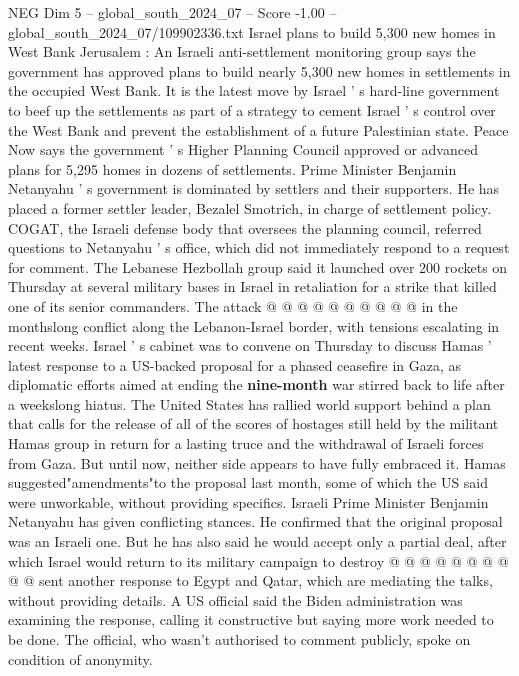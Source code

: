 \begin{textsample}{NEG Dim 5 – global\_south\_2024\_07 – Score -1.00 – global\_south\_2024\_07/109902336.txt}  \label{ex:f5_neg_272}
Israel plans to build 5,300 new homes in West Bank Jerusalem : An Israeli anti-settlement monitoring group says the government has approved plans to build nearly 5,300 new homes in settlements in the occupied West Bank.
It is the latest move by Israel ' s hard-line government to beef up the settlements as part of a strategy to cement Israel ' s control over the West Bank and prevent the establishment of a future Palestinian state.
Peace Now says the government ' s Higher Planning Council approved or advanced plans for 5,295 homes in dozens of settlements.
Prime Minister Benjamin Netanyahu ' s government is dominated by settlers and their supporters.
He has placed a former settler leader, Bezalel Smotrich, in charge of settlement policy.
COGAT, the Israeli defense body that oversees the planning council, referred questions to Netanyahu ' s office, which did not immediately respond to a request for comment.
The Lebanese Hezbollah group said it launched over 200 rockets on Thursday at several military bases in Israel in retaliation for a strike that killed one of its senior commanders.
The attack @ @ @ @ @ @ @ @ @ @ in the monthslong conflict along the Lebanon-Israel border, with tensions escalating in recent weeks.
Israel ' s cabinet was to convene on Thursday to discuss Hamas ' latest response to a US-backed proposal for a phased ceasefire in Gaza, as diplomatic efforts aimed at ending the \textbf{nine-month} war stirred back to life after a weekslong hiatus.
The United States has rallied world support behind a plan that calls for the release of all of the scores of hostages still held by the militant Hamas group in return for a lasting truce and the withdrawal of Israeli forces from Gaza.
But until now, neither side appears to have fully embraced it.
Hamas suggested"amendments"to the proposal last month, some of which the US said were unworkable, without providing specifics.
Israeli Prime Minister Benjamin Netanyahu has given conflicting stances.
He confirmed that the original proposal was an Israeli one.
But he has also said he would accept only a partial deal, after which Israel would return to its military campaign to destroy @ @ @ @ @ @ @ @ @ @ sent another response to Egypt and Qatar, which are mediating the talks, without providing details.
A US official said the Biden administration was examining the response, calling it constructive but saying more work needed to be done.
The official, who wasn't authorised to comment publicly, spoke on condition of anonymity.

\end{textsample}

